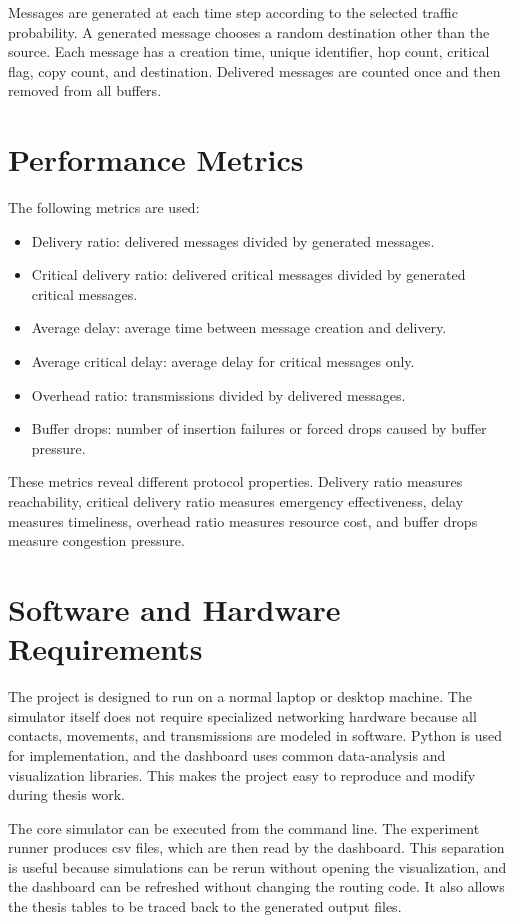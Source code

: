 Messages are generated at each time step according to the selected traffic probability. A generated message chooses a random destination other than the source. Each message has a creation time, unique identifier, hop count, critical flag, copy count, and destination. Delivered messages are counted once and then removed from all buffers.

\section{Performance Metrics}
The following metrics are used:

\begin{itemize}
	\item Delivery ratio: delivered messages divided by generated messages.
	\item Critical delivery ratio: delivered critical messages divided by generated critical messages.
	\item Average delay: average time between message creation and delivery.
	\item Average critical delay: average delay for critical messages only.
	\item Overhead ratio: transmissions divided by delivered messages.
	\item Buffer drops: number of insertion failures or forced drops caused by buffer pressure.
\end{itemize}

These metrics reveal different protocol properties. Delivery ratio measures reachability, critical delivery ratio measures emergency effectiveness, delay measures timeliness, overhead ratio measures resource cost, and buffer drops measure congestion pressure.

\section{Software and Hardware Requirements}
The project is designed to run on a normal laptop or desktop machine. The simulator itself does not require specialized networking hardware because all contacts, movements, and transmissions are modeled in software. Python is used for implementation, and the dashboard uses common data-analysis and visualization libraries. This makes the project easy to reproduce and modify during thesis work.

The core simulator can be executed from the command line. The experiment runner produces \ac{csv} files, which are then read by the dashboard. This separation is useful because simulations can be rerun without opening the visualization, and the dashboard can be refreshed without changing the routing code. It also allows the thesis tables to be traced back to the generated output files.

